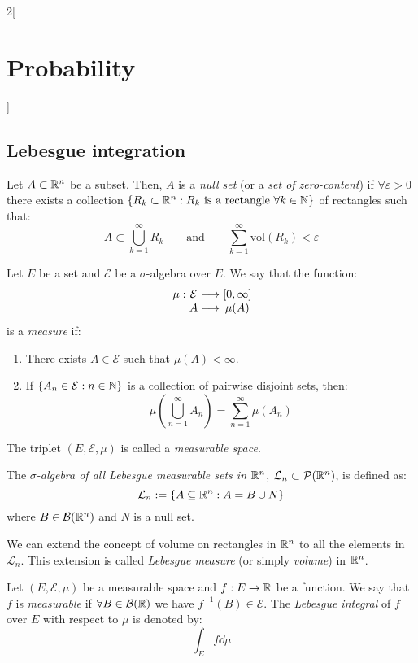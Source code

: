 \documentclass[../../../main.tex]{subfiles}
\begin{document}
\begin{multicols}{2}[\section{Probability}]
  \subsection{Lebesgue integration}
  \begin{definition}
    Let $A\subset\mathbb{R}^n$ be a subset. Then, $A$ is a \emph{null set} (or a \emph{set of zero-content}) if $\forall \varepsilon>0$ there exists a collection $\{R_k\subset\mathbb{R}^n:R_k\text{ is a rectangle }\forall k\in\mathbb{N}\}$ of rectangles such that:
    $$A\subset\bigcup_{k=1}^\infty R_k\qquad\text{and}\qquad\sum_{k=1}^\infty\text{vol}(R_k)<\varepsilon$$
  \end{definition}
  \begin{definition}
    Let $E$ be a set and $\mathcal{E}$ be a $\sigma$-algebra over $E$. We say that the function:
    $$
      \function{\mu}{\mathcal{E}}{[0,\infty]}{A}{\mu(A)}
    $$
    is a \emph{measure} if:
    \begin{enumerate}
      \item There exists $A\in\mathcal{E}$ such that $\mu(A)<\infty$.
      \item If $\{A_n\in\mathcal{E}:n\in\mathbb{N}\}$ is a collection of pairwise disjoint sets, then: $$\mu\left(\bigcup_{n=1}^\infty A_n\right)=\sum_{n=1}^\infty \mu(A_n)$$
    \end{enumerate}
    The triplet $(E,\mathcal{E},\mu)$ is called a \emph{measurable space}.
  \end{definition}
  \begin{definition}
    The \emph{$\sigma$-algebra of all Lebesgue measurable sets in $\mathbb{R}^n$}, $\mathcal{L}_n\subset\mathcal{P}(\mathbb{R}^n)$, is defined as:
    \begin{equation*}
      \mathcal{L}_n:=\{A\subseteq\mathbb{R}^n:A=B\cup N\}
    \end{equation*}
    where $B\in\mathcal{B}(\mathbb{R}^n)$ and $N$ is a null set.
  \end{definition}
  \begin{theorem}
    We can extend the concept of volume on rectangles in $\mathbb{R}^n$ to all the elements in $\mathcal{L}_n$. This extension is called \emph{Lebesgue measure} (or simply \emph{volume}) in $\mathbb{R}^n$.
  \end{theorem}
  \begin{definition}
    Let $(E,\mathcal{E},\mu)$ be a measurable space and $f:E\rightarrow\mathbb{R}$ be a function. We say that $f$ is \emph{measurable} if $\forall B\in\mathcal{B}(\mathbb{R})$ we have $f^{-1}(B)\in\mathcal{E}$. The \emph{Lebesgue integral} of $f$ over $E$ with respect to $\mu$ is denoted by: $$\int_Ef\dd\mu$$

\end{definition}
\end{multicols}
\end{document}

